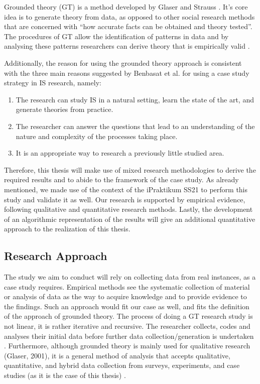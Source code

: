 Grounded theory (GT) is a method developed by Glaser and Strauss \cite{Glaser1968}. It’s core idea is to generate theory from data, as opposed to other social research methods that are concerned with “how accurate facts can be obtained and theory tested”. The procedures of GT allow the identification of patterns in data and by analysing these patterns researchers can derive theory that is empirically valid \cite{Martin1986}.

Additionally, the reason for using the grounded theory approach is consistent with the three main reasons suggested by Benbasat et al. \cite{Benbasat1987} for using a case study strategy in IS research, namely:

\begin{enumerate}
    \item The research can study IS in a natural setting, learn the state of the art, and generate
theories from practice.
    \item The researcher can answer the questions that lead to an understanding of the nature
and complexity of the processes taking place.
    \item It is an appropriate way to research a previously little studied area.
\end{enumerate}

Therefore, this thesis will make use of mixed research methodologies to derive the required results and to abide to the framework of the case study. As already mentioned, we made use of the context of the iPraktikum SS21 to perform this study and validate it as well. Our research is supported by empirical evidence, following qualitative and quantitative research methods. Lastly, the development of an algorithmic representation of the results will give an additional quantitative approach to the realization of this thesis.

\subsection{Research Approach} \label{ResearchApproach}

The study we aim to conduct will rely on collecting data from real instances, as a case study requires. Empirical methods see the systematic collection of material or analysis of data as the way to acquire knowledge and to provide evidence to the findings. Such an approach would fit our case as well, and fits the definition of the approach of grounded theory. The process of doing a GT research study is not linear, it is rather iterative and recursive. The researcher collects, codes and analyses their initial data before further data collection/generation is undertaken \cite{Chun2019}. Furthermore, although grounded theory is mainly used for qualitative research (Glaser, 2001), it is a
general method of analysis that accepts qualitative, quantitative, and hybrid data collection from surveys, experiments, and case studies (as it is the case of this thesis) \cite{Glaser1978}.

